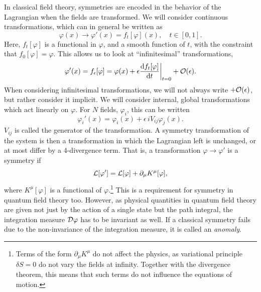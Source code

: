 In classical field theory, symmetries are encoded in the behavior of the Lagrangian when the fields are transformed.
We will consider continuous transformations, which can in general be written as
\begin{equation}
    \varphi(x) \longrightarrow \varphi'(x) = f_t[\varphi](x), \quad t \in [0, 1].
\end{equation}
%
Here, $f_t[\varphi]$ is a functional in $\varphi$, and a smooth function of $t$, with the constraint that $f_0[\varphi] = \varphi$.
This allows us to look at ``infinitesimal'' transformations,
\begin{equation}
    \label{infinitesimal transformation}
    \varphi'(x) = f_\epsilon[\varphi] 
    = \varphi(x) + \epsilon \odv{ f_t[\varphi] }{t}\bigg |_{t=0} + \Oh(\epsilon).
\end{equation}
%
When considering infinitesimal transformations, we will not always write $ + \mathcal O(\epsilon)$, but rather consider it implicit.
We will consider internal, global transformations which act linearly on $\varphi$.
For $N$ fields, $\varphi_i$, this can be written
\begin{equation}
    \label{linear field transformation}
    \varphi_i'(x) = \varphi_i(x) + \epsilon \, i V_{ij} \varphi_j(x).
\end{equation}
%
$V_{ij}$ is called the generator of the transformation.
A symmetry transformation of the system is then a transformation in which the Lagrangian left is unchanged, or at most differ by a 4-divergence term.
That is, a transformation $\varphi \rightarrow \varphi'$ is a symmetry if 
\begin{equation}
    \mathcal{L}[\varphi'] = \mathcal{L}[\varphi] + \partial_\mu K^\mu[\varphi],
\end{equation}
%
where $K^\mu[\varphi]$ is a functional of $\varphi$.\footnote{
    Terms of the form $\partial_\mu K^\mu$ do not affect the physics, as variational principle $\delta S = 0$ do not vary the fields at infinity. Together with the divergence theorem, this means that such terms do not influence the equations of motion.}
This is a requirement for symmetry in quantum field theory too.
However, as physical quantities in quantum field theory are given not just by the action of a single state but the path integral, the integration measure $\mathcal D \varphi$ has to be invariant as well.
If a classical symmetry fails due to the non-invariance of the integration measure, it is called an \emph{anomaly}.

